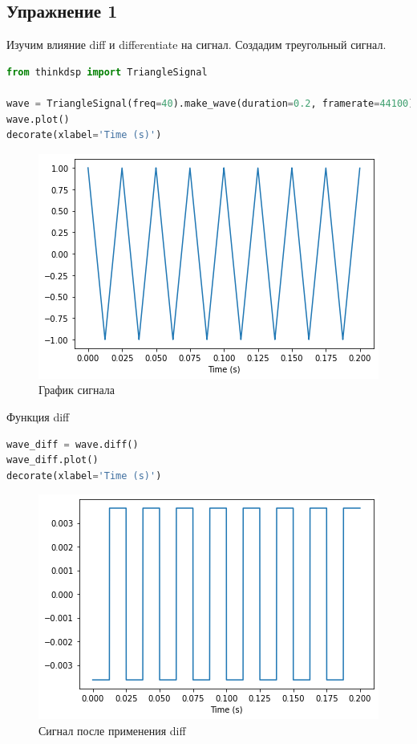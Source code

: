 \subsection{Упражнение 1}

Изучим влияние diff и differentiate на сигнал. Создадим треугольный сигнал.

\begin{lstlisting}[language=Python]
from thinkdsp import TriangleSignal

wave = TriangleSignal(freq=40).make_wave(duration=0.2, framerate=44100)
wave.plot()
decorate(xlabel='Time (s)')
\end{lstlisting}

\begin{figure}[H]
	\begin{center}
		\includegraphics[scale=1]{fig/lab09/lab09_01.png}
		\caption{График сигнала}
	\end{center}
\end{figure}

Функция diff

\begin{lstlisting}[language=Python]
wave_diff = wave.diff()
wave_diff.plot()
decorate(xlabel='Time (s)')
\end{lstlisting}

\begin{figure}[H]
	\begin{center}
		\includegraphics[scale=1]{fig/lab09/lab09_02.png}
		\caption{Сигнал после применения diff}
	\end{center}
\end{figure}

